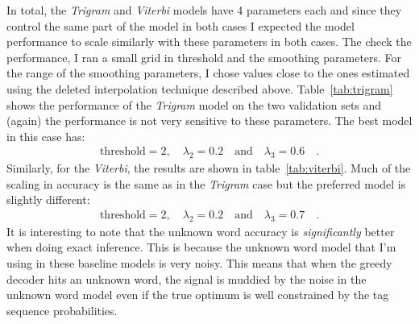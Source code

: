 \documentclass[11pt]{article}
\begin{document}
In total, the \emph{Trigram} and \emph{Viterbi} models have 4 parameters each
and since they control the same part of the model in both cases I expected the
model performance to scale similarly with these parameters in both cases.
The check the performance, I ran a small grid in threshold and the smoothing
parameters.
For the range of the smoothing parameters, I chose values close to the ones
estimated using the deleted interpolation technique described above.
Table~\ref{tab:trigram} shows the performance of the \emph{Trigram} model on
the two validation sets and (again) the performance is not very sensitive to
these parameters.
The best model in this case has:
\begin{eqnarray}
\mathrm{threshold} = 2,\quad\lambda_2 = 0.2\quad\mbox{and}\quad
\lambda_3 = 0.6\quad.
\end{eqnarray}
Similarly, for the \emph{Viterbi}, the results are shown in
table~\ref{tab:viterbi}.
Much of the scaling in accuracy is the same as in the \emph{Trigram} case but
the preferred model is slightly different:
\begin{eqnarray}
\mathrm{threshold} = 2,\quad\lambda_2 = 0.2\quad\mbox{and}\quad
\lambda_3 = 0.7\quad.
\end{eqnarray}
It is interesting to note that the unknown word accuracy is
\emph{significantly} better when doing exact inference.
This is because the unknown word model that I'm using in these baseline models
is very noisy.
This means that when the greedy decoder hits an unknown word, the signal is
muddied by the noise in the unknown word model even if the true optimum is
well constrained by the tag sequence probabilities.
\end{document}
